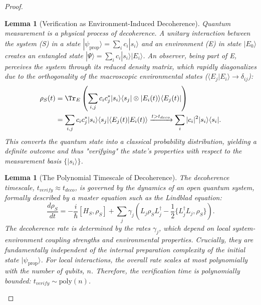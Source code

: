 \documentclass[11pt, letterpaper]{report}
\theoremstyle{plain} %
\newtheorem{lemma}[theorem]{Lemma}
\theoremstyle{definition} %
\theoremstyle{remark} %
\begin{document}
\begin{proof}
\begin{lemma}[Verification as Environment-Induced Decoherence]
\label{lemma:verification_as_decoherence}
Quantum measurement is a physical process of decoherence. A unitary interaction between the system (S) in a state $|\psi_{\text{prop}}\rangle = \sum_i c_i|s_i\rangle$ and an environment (E) in state $|E_0\rangle$ creates an entangled state $|\Psi\rangle = \sum_i c_i |s_i\rangle|E_i\rangle$. An observer, being part of E, perceives the system through its reduced density matrix, which rapidly diagonalizes due to the orthogonality of the macroscopic environmental states ($\langle E_j|E_i\rangle \to \delta_{ij}$):
\begin{align}
    \rho_S(t) &= \Tr_E\left( \sum_{i,j} c_i c_j^* |s_i\rangle\langle s_j| \otimes |E_i(t)\rangle\langle E_j(t)| \right) \\
    &= \sum_{i,j} c_i c_j^* |s_i\rangle\langle s_j| \langle E_j(t)|E_i(t)\rangle \xrightarrow{t > t_{deco}} \sum_i |c_i|^2 |s_i\rangle\langle s_i|.
\end{align}
This converts the quantum state into a classical probability distribution, yielding a definite outcome and thus "verifying" the state's properties with respect to the measurement basis $\{|s_i\rangle\}$.
\end{lemma}

\begin{lemma}[The Polynomial Timescale of Decoherence]
\label{lemma:decoherence_timescale}
The decoherence timescale, $t_{verify} \approx t_{deco}$, is governed by the dynamics of an open quantum system, formally described by a master equation such as the Lindblad equation:
\begin{equation}
    \frac{d\rho_S}{dt} = -\frac{i}{\hbar}[H_S, \rho_S] + \sum_j \gamma_j \left( L_j \rho_S L_j^\dagger - \frac{1}{2}\{L_j^\dagger L_j, \rho_S\} \right).
\end{equation}
The decoherence rate is determined by the rates $\gamma_j$, which depend on local system-environment coupling strengths and environmental properties. Crucially, they are fundamentally independent of the internal preparation complexity of the initial state $|\psi_{\text{prop}}\rangle$. For local interactions, the overall rate scales at most polynomially with the number of qubits, $n$. Therefore, the verification time is polynomially bounded: $t_{verify} \sim \text{poly}(n)$.
\end{lemma}


\end{proof}
\end{document}

